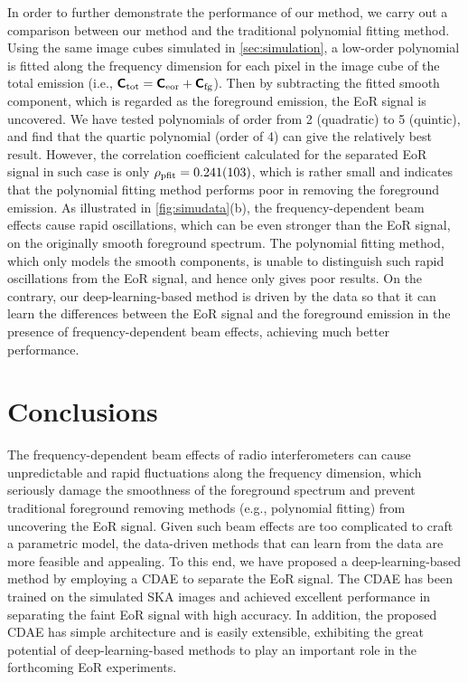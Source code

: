 \documentclass[letters,a4paper,fleqn,usenatbib]{mnras}
\newcommand{\R}[1]{\mathrm{#1}}
\newcommand{\M}[1]{\mathbfss{#1}}
\begin{document}
In order to further demonstrate the performance of our method, we carry
out a comparison between our method and the traditional polynomial
fitting method.
Using the same image cubes simulated in \autoref{sec:simulation},
a low-order polynomial is fitted along the frequency dimension for each
pixel in the image cube of the total emission (i.e.,
$\M{C}_{\R{tot}} = \M{C}_{\R{eor}} + \M{C}_{\R{fg}}$).
Then by subtracting the fitted smooth component, which is regarded as
the foreground emission, the EoR signal is uncovered.
We have tested polynomials of order from 2 (quadratic) to 5 (quintic),
and find that the quartic polynomial (order of 4) can give the
relatively best result.
However, the correlation coefficient calculated for the separated EoR
signal in such case is only $\rho_{\R{pfit}} = \num{0.241 +- 0.103}$,
which is rather small and indicates that the polynomial fitting method
performs poor in removing the foreground emission.
As illustrated in \autoref{fig:simudata}(b), the frequency-dependent
beam effects cause rapid oscillations, which can be even stronger than
the EoR signal, on the originally smooth foreground spectrum.
The polynomial fitting method, which only models the smooth components,
is unable to distinguish such rapid oscillations from the EoR signal,
and hence only gives poor results.
On the contrary, our deep-learning-based method is driven by the data
so that it can learn the differences between the EoR signal and the
foreground emission in the presence of frequency-dependent beam effects,
achieving much better performance.


\section{Conclusions}
\label{sec:conclusions}

The frequency-dependent beam effects of radio interferometers can cause
unpredictable and rapid fluctuations along the frequency dimension,
which seriously damage the smoothness of the foreground spectrum and
prevent traditional foreground removing methods (e.g., polynomial
fitting) from uncovering the EoR signal.
Given such beam effects are too complicated to craft a parametric
model, the data-driven methods that can learn from the data are more
feasible and appealing.
To this end, we have proposed a deep-learning-based method by employing
a CDAE to separate the EoR signal.
The CDAE has been trained on the simulated SKA images and achieved
excellent performance in separating the faint EoR signal with high
accuracy.
In addition, the proposed CDAE has simple architecture and is easily
extensible, exhibiting the great potential of deep-learning-based
methods to play an important role in the forthcoming EoR experiments.
\end{document}
